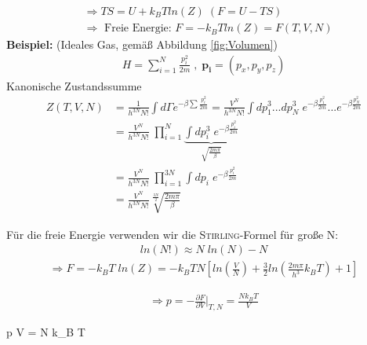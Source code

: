 \documentclass[12pt]{article}
\begin{document}
\begin{itemize}
\begin{align}
&\Rightarrow TS = U + k_B T ln(Z) \; (F= U - TS) \\
& \Rightarrow \mbox{ Freie Energie: } F = - k_B T ln(Z) = F(T,V,N)
\end{align}
\textbf{Beispiel:} (Ideales Gas, gemäß Abbildung \ref{fig:Volumen})
\begin{align*}
H = \sum_{i=1}^N \frac{p_i ^2}{2m} \; ,  \; \mathbf{p_i} = (p_x, p_y, p_z)
\end{align*}
Kanonische Zustandssumme
\begin{align*}
Z(T,V,N) &= \frac{1}{h^{3N} N!} \int d\Gamma e^{- \beta \sum \frac{p_i ^2}{2m} } = \frac{V^N}{h^{3N} N!} \int dp_1 ^3 ...dp_N ^3 \;  e^{ - \beta \frac{p_1 ^2}{2m}} ... e^{- \beta \frac{p_N ^2}{2m}}  \\
&=  \frac{V^N}{h^{3N} N!} \; \prod_{i=1}^N \underbrace{\int dp_i ^3 \; e^{- \beta \frac{p_i ^2}{2m}} }_{ \sqrt{\frac{2m\pi}{\beta}}} \tag{$i = 1...N$ Teilchen} \\
&= \frac{V^N}{h^{3N} N!} \; \prod_{i=1}^{3N}  \int dp_i  \; e^{- \beta \frac{p_i ^2}{2m}} \tag{$i = 1...3N,$  N Teilchen mit $(x,y,z)$} \\
&= \frac{V^N}{h^{3N} N!} \sqrt[\frac{3N}{2}]{\frac{2m\pi}{\beta}}
\end{align*} %
\end{itemize}
Für die freie Energie verwenden wir die \textsc{Stirling}-Formel für große N:
\begin{align}
ln(N!) \approx N \; ln(N) - N
\end{align}
\begin{align}
\Rightarrow F = -k_B T \; ln(Z) = -k_B T N \left[ ln \left(\frac{V}{N}\right) + \frac{3}{2} ln \left(\frac{2 m \pi }{h^3} k_BT \right) +1 \right]
\end{align}

\begin{align}
\Rightarrow p = - \frac{\partial F}{\partial V} \biggr\vert_{T,N} = \frac{N k_B T}{V}
\end{align}

\begin{tcolorbox}[ams gather,title= ideale Gasgleichung, colback=blue!10!white, colframe=blue!30!black] 
 p V = N k_B T
\end{tcolorbox}
\end{document}
